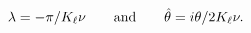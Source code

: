 \begin{equation}
\lambda =-\pi /K_{\ell }\nu \qquad \text{and\qquad }\hat{\theta}=i\theta
/2K_{\ell }\nu .
\end{equation}%
